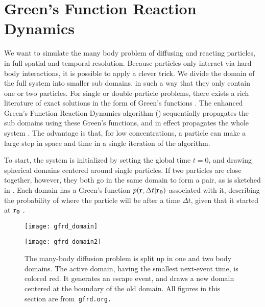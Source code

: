 \section{Green's Function Reaction Dynamics}

We want to simulate the many body problem of diffusing and reacting particles, in full spatial and temporal resolution. Because particles only interact via hard body interactions, it is possible to apply a clever trick. We divide the domain of the full system into smaller sub domains, in such a way that they only contain one or two particles. For single or double particle problems, there exists a rich literature of exact solutions in the form of Green's functions \cite{Carslaw1959}\cite{Beck1992}. The enhanced Green's Function Reaction Dynamics algorithm (\GFRD) sequentially propagates the sub domains using these Green's functions, and in effect propagates the whole system \cite{VanZon2005,VanZon2006,Takahashi2010,Bossen2011a}. The advantage is that, for low concentrations, a particle can make a large step in space and time in a single iteration of the algorithm.


To start, the system is initialized by setting the global time $t=0$, and drawing spherical domains centered around single particles. If two particles are close together, however, they both go in the same domain to form a pair, as is sketched in . Each domain has a Green's function $p({\bf r}, \Delta t|{\bf r_0})$ associated with it, describing the probability of where the particle will be after a time $\Delta t$, given that it started at ${\bf r_0}$ \cite{Carslaw1959}. 

\begin{figure}[ht]
\begin{minipage}[ht]{.5\linewidth}
\centering
\texttt{[image: gfrd\_domain]}
\end{minipage}
\begin{minipage}[ht]{.5\linewidth}
\centering
\texttt{[image: gfrd\_domain2]}
\end{minipage}
\caption{ The many-body diffusion problem is split up in one and two body domains. The active domain, having the smallest next-event time, is colored red. It generates an escape event, and draws a new domain centered at the boundary of the old domain. All figures in this section are from\tt{ gfrd.org}.}
\end{figure}

